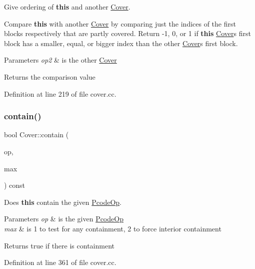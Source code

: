 Give ordering of {\bfseries{this}} and another \mbox{\hyperlink{class_cover}{Cover}}. 

Compare {\bfseries{this}} with another \mbox{\hyperlink{class_cover}{Cover}} by comparing just the indices of the first blocks respectively that are partly covered. Return -\/1, 0, or 1 if {\bfseries{this}} \mbox{\hyperlink{class_cover}{Cover}}\textquotesingle{}s first block has a smaller, equal, or bigger index than the other \mbox{\hyperlink{class_cover}{Cover}}\textquotesingle{}s first block. 
\begin{DoxyParams}{Parameters}
{\em op2} & is the other \mbox{\hyperlink{class_cover}{Cover}} \\
\hline
\end{DoxyParams}
\begin{DoxyReturn}{Returns}
the comparison value 
\end{DoxyReturn}


Definition at line 219 of file cover.\+cc.

\mbox{\label{class_cover_a5db9b2042d36daf2bead4a47bddd8349}} 
\subsubsection{\texorpdfstring{contain()}{contain()}}
{\footnotesize\ttfamily bool Cover\+::contain (\begin{DoxyParamCaption}\item[{const \mbox{\hyperlink{class_pcode_op}{Pcode\+Op}} $\ast$}]{op,  }\item[{int4}]{max }\end{DoxyParamCaption}) const}



Does {\bfseries{this}} contain the given \mbox{\hyperlink{class_pcode_op}{Pcode\+Op}}. 


\begin{DoxyParams}{Parameters}
{\em op} & is the given \mbox{\hyperlink{class_pcode_op}{Pcode\+Op}} \\
\hline
{\em max} & is 1 to test for any containment, 2 to force interior containment \\
\hline
\end{DoxyParams}
\begin{DoxyReturn}{Returns}
true if there is containment 
\end{DoxyReturn}


Definition at line 361 of file cover.\+cc.

